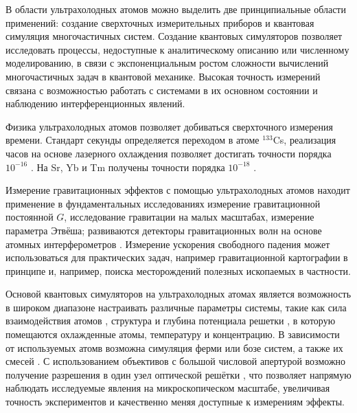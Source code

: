 В области ультрахолодных атомов можно выделить две принципиальные области применений: создание сверхточных измерительных приборов и квантовая симуляция многочастичных систем. Создание квантовых симуляторов позволяет исследовать процессы, недоступные к аналитическому описанию или численному моделированию, в связи с экспоненциальным ростом сложности вычислений многочастичных задач в квантовой механике. Высокая точность измерений связана с возможностью работать с системами в их основном состоянии и наблюдению интерференционных явлений.





Физика ультрахолодных атомов позволяет добиваться сверхточного измерения времени. Стандарт секунды определяется переходом в атоме ${}^{133}$Cs, реализация часов на основе лазерного охлаждения позволяет достигать точности порядка $10^{-16}$ \cite{schmittberger2020review, 799241}. На Sr, Yb и Tm получены точности порядка $10^{-18}$ \cite{schmittberger2020review, Bloom_2014,Golovizin2019}. 

Измерение гравитационных эффектов с помощью ультрахолодных атомов находит применение в фундаментальных исследованиях \cite{Tino_2021} измерение гравитационной постоянной $G$, исследование гравитации на малых масштабах, измерение параметра Этвёша; развиваются детекторы гравитационных волн на основе атомных интерферометров \cite{Dimopoulos_2009}. Измерение ускорения свободного падения может использоваться для практических задач, например гравитационной картографии в принципе \cite{QuantumSensing} и, например, поиска месторождений полезных ископаемых \cite{Tino_2021} в частности.




Основой квантовых симуляторов на ультрахолодных атомах является возможность в широком диапазоне настраивать различные параметры системы, такие как сила взаимодействия атомов \cite{bloch2012quantum}
, структура и глубина потенциала решетки \cite{lewenstein_ultracold_2007, gross_quantum_2017, tsyganok2023boseeinstein}, в которую помещаются охлажденные атомы, температуру и концентрацию. В зависимости от используемых атомв возможна симуляция ферми или бозе систем, а также их смесей \cite{yamamoto2012lattice}. С использованием объективов с большой числовой апертурой возможно получение разрешения в один узел оптической решётки \cite{Sherson_2010}, что позволяет напрямую наблюдать исследуемые явления на микроскопическом масштабе, увеличивая точность экспериментов и качественно меняя доступные к измерениям эффекты.  

